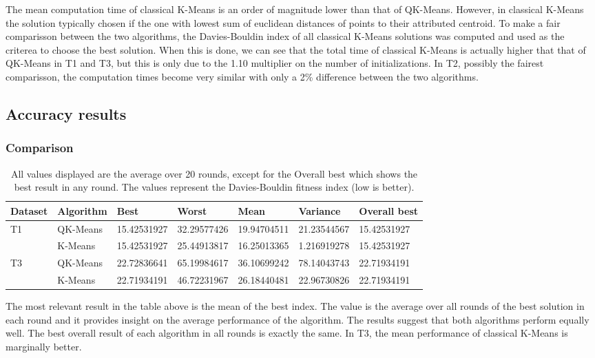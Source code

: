 \documentclass[12pt,a4paper,final]{article}
\begin{document}
The mean computation time of classical K-Means is an order of magnitude lower than that of QK-Means. However, in classical K-Means the solution typically chosen if the one with lowest sum of euclidean distances of points to their attributed centroid. To make a fair comparisson between the two algorithms, the Davies-Bouldin index of all classical K-Means solutions was computed and used as the criterea to choose the best solution. When this is done, we can see that the total time of classical K-Means is actually higher that that of QK-Means in T1 and T3, but this is only due to the 1.10 multiplier on the number of initializations. In T2, possibly the fairest comparisson, the computation times become very similar with only a 2\% difference between the two algorithms.

\subsection{Accuracy results}

\subsubsection{Comparison}
\begin{table}[h]
\caption{All values displayed are the average over 20 rounds, except for the Overall best which shows the best result in any round. The values represent the Davies-Bouldin fitness index (low is better).}
\label{my-label}
\begin{tabular}{l|l|l|l|l|l|l|}
\hline
\multicolumn{1}{|l|}{Dataset} & Algorithm & Best        & Worst       & Mean        & Variance    & Overall best \\ \hline
\multicolumn{1}{|l|}{T1}      & QK-Means  & 15.42531927 & 32.29577426 & 19.94704511 & 21.23544567 & 15.42531927  \\ \hline
                              & K-Means   & 15.42531927 & 25.44913817 & 16.25013365 & 1.216919278 & 15.42531927  \\ \hline
\multicolumn{1}{|l|}{T3}      & QK-Means  & 22.72836641 & 65.19984617 & 36.10699242 & 78.14043743 & 22.71934191  \\ \hline
                              & K-Means   & 22.71934191 & 46.72231967 & 26.18440481 & 22.96730826 & 22.71934191  \\ \cline{2-7} 
\end{tabular}
\end{table}

The most relevant result in the table above is the mean of the best index. The value is the average over all rounds of the best solution in each round and it provides insight on the average performance of the algorithm. The results suggest that both algorithms perform equally well. The best overall result of each algorithm in all rounds is exactly the same. In T3, the mean performance of classical K-Means is marginally better.
\end{document}

